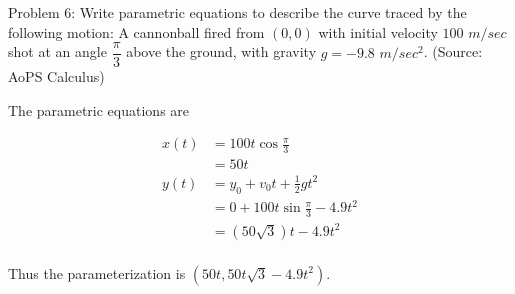 Problem 6: Write parametric equations to describe the curve traced by the following motion: A cannonball fired from $(0, 0)$ with initial velocity $100$ $m/sec$ shot at an angle $\dfrac{\pi}{3}$ above the ground, with gravity $g = -9.8$ $m/sec^2$. (Source: AoPS Calculus)

The parametric equations are

\begin{align*}
x(t) &= 100t \cos \frac{\pi}{3} \\
&= 50t \\
y(t) &= y_0 + v_0 t + \frac{1}{2} gt^2 \\
&= 0 + 100t \sin \frac{\pi}{3} - 4.9t^2 \\
&= (50 \sqrt 3) t - 4.9t^2 \\
\end{align*}

Thus the parameterization is $\boxed{(50t, 50t \sqrt 3 - 4.9t^2)}$.
